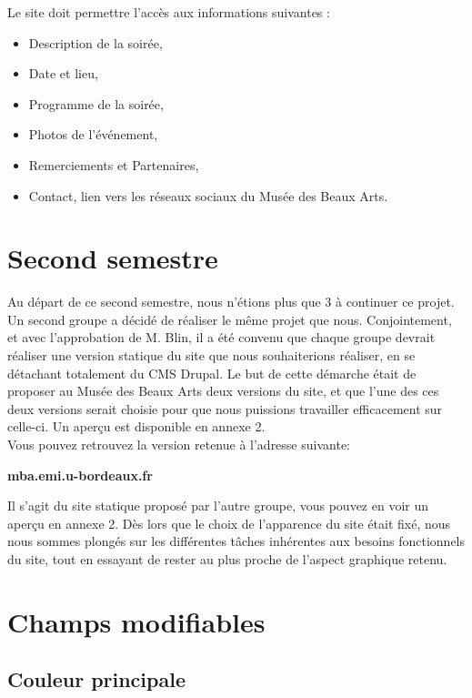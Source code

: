 \documentclass[11pt]{report}
\begin{document}
Le site doit permettre l'accès aux informations suivantes :
\begin{itemize}
	\item Description de la soirée,
	\item Date et lieu,
	\item Programme de la soirée,
	\item Photos de l'événement,
	\item Remerciements et Partenaires,
	\item Contact, lien vers les réseaux sociaux du Musée des Beaux Arts.
\end{itemize}

\vspace{0.5cm}

\section{Second semestre}

Au départ de ce second semestre, nous n'étions plus que 3 à continuer ce projet.
Un second groupe a décidé de réaliser le même projet que nous. Conjointement,
et avec l'approbation de M. Blin, il a été convenu que chaque groupe devrait
réaliser une version statique du site que nous souhaiterions réaliser, en se
détachant totalement du CMS Drupal. Le but de cette démarche était de proposer au
Musée des Beaux Arts deux versions du site, et que l'une des ces deux versions serait
choisie pour que nous puissions travailler efficacement sur celle-ci. Un aperçu
est disponible en annexe 2. \\
Vous pouvez retrouvez la version retenue à l'adresse suivante:

\vspace{0.5cm}

\textbf{mba.emi.u-bordeaux.fr}\\

\par
Il s'agit du site statique proposé par l'autre groupe, vous pouvez en voir un
aperçu en annexe 2. Dès lors que le choix de l'apparence du site était fixé,
nous nous sommes plongés sur les différentes tâches inhérentes aux besoins
fonctionnels du site, tout en essayant de rester au plus proche de l'aspect
graphique retenu.

\newpage
\section{Champs modifiables}

\subsection{Couleur principale}
\end{document}
